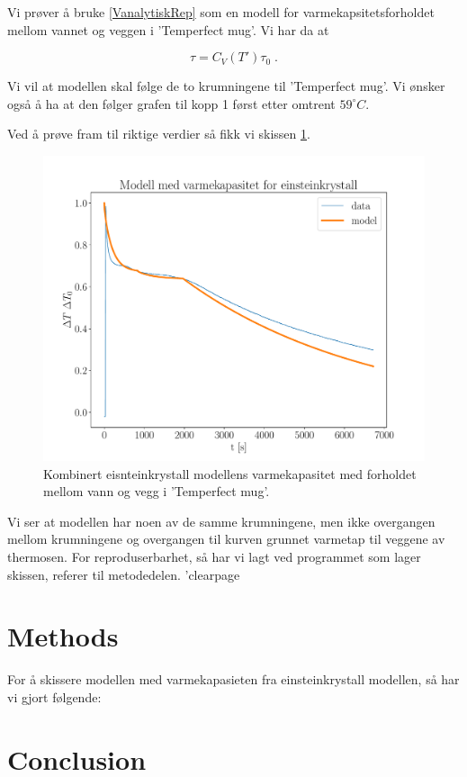 \documentclass[ reprint, amsmath,amssymb, aps]{revtex4-2}
\begin{document}
Vi prøver å bruke \ref{VanalytiskRep} som en modell for varmekapsitetsforholdet mellom vannet og veggen i 'Temperfect mug'. Vi har da at

$$\tau = C_V(T')\tau_0 \; .$$

Vi vil at modellen skal følge de to krumningene til 'Temperfect mug'. Vi ønsker også å ha at den følger grafen til kopp 1 først etter omtrent $59 ^{\circ}C$.

Ved å prøve fram til riktige verdier så fikk vi skissen \ref{epsTerm}.

\begin{figure}[H]
\centering
\includegraphics[scale=0.35]{modelleinstein.pdf}
\caption{Kombinert eisnteinkrystall modellens varmekapasitet med forholdet mellom vann og vegg i 'Temperfect mug'.}
\label{epsTerm}
\end{figure}

Vi ser at modellen har noen av de samme krumningene, men ikke overgangen mellom krumningene og overgangen til kurven grunnet varmetap til veggene av thermosen. For reproduserbarhet, så har vi lagt ved programmet som lager skissen, referer til metodedelen.
'clearpage
\onecolumngrid
\section{Methods}

For å skissere modellen med varmekapasieten fra einsteinkrystall modellen, så har vi gjort følgende:


\twocolumngrid
\section{Conclusion}
\end{document}
